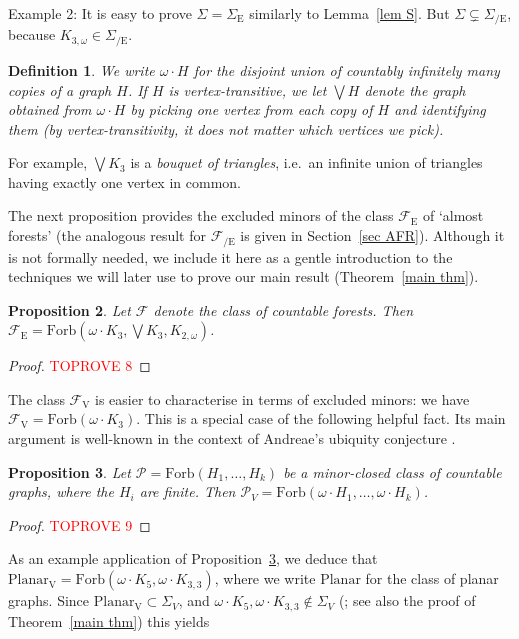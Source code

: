 \documentclass{article}
\newcommand{\forb}[1]{\mathrm{Forb}(#1)}
\newcommand{\plV}{\ensuremath{\mathrm{Planar_V}}}
\newcommand{\frs}{\mathcal{F}}
\newcommand{\frsV}{\frs_\mathrm{V}}
\newcommand{\frsE}{\frs_\mathrm{E}}
\newcommand{\frsCE}{\frs_\mathrm{{/E}}}
\newcommand{\Sig}{\ensuremath{\Sigma}}
\newcommand{\omdot}{\omega \cdot}
\newcommand{\defi}[1]{{\color{darkgray}\emph{#1}}}
\newtheorem{proposition}{Proposition}[section]
\newtheorem{definition}[proposition]{Definition}
\newcommand{\cp}{\ensuremath{\mathcal P}}
\newcommand{\Ktt}{\ensuremath{K_{3,3}}}
\newcommand{\Lr}[1]{Lemma~\ref{#1}}
\newcommand{\Tr}[1]{Theorem~\ref{#1}}
\newcommand{\Sr}[1]{Section~\ref{#1}}
\newcommand{\Prr}[1]{Pro\-position~\ref{#1}}
\begin{document}
Example 2: It is easy to prove $\Sig= \Sig_\mathrm{E}$ similarly to \Lr{lem S}. But $\Sig \subsetneq \Sig_\mathrm{/E}$, because $K_{3,\omega} \in \Sig_\mathrm{/E}$.


\begin{definition} \label{def omdot}
We write \defi{$\omdot H$} for the disjoint union of countably infinitely many copies of a graph $H$. If $H$ is  vertex-transitive, we let \defi{$\bigvee H$} denote the graph obtained from $\omdot H$ by picking one vertex from each copy of $H$ and identifying them (by vertex-transitivity, it does not matter which vertices we pick).
\end{definition} 
 For example, $\bigvee K_3$ is a \defi{bouquet of triangles}, i.e.\ an infinite union of triangles having exactly one vertex in common.

\medskip

The next proposition provides the excluded minors of the class $\frsE$ of `almost forests' (the analogous result for $\frsCE$ is given in \Sr{sec AFR}).
Although it is not formally needed, we include it here as a gentle introduction to the techniques we will later use to prove our main result (\Tr{main thm}).


\begin{proposition} \label{prop FE}
Let $\frs$ denote the class of countable forests. Then $\frsE= \forb{\omdot K_3, \bigvee K_3, K_{2,\omega}}$.
\end{proposition}
\begin{proof}\textcolor{red}{TOPROVE 8}\end{proof}

The class $\frsV$ is easier to characterise in terms of excluded minors: we have $\frsV= \forb{\omdot K_3}$. This is a special case of the following helpful fact. Its main argument is well-known in the context of Andreae's ubiquity conjecture \cite{AndUb}.

\begin{proposition} \label{prop PV}
Let $\cp= \forb{H_1, \ldots, H_k}$ be a minor-closed class of countable graphs, where the $H_i$ are finite. Then $\cp_V= \forb{\omdot H_1, \ldots, \omdot H_k}$.
\end{proposition}
\begin{proof}\textcolor{red}{TOPROVE 9}\end{proof}

As an example application of \Prr{prop PV}, we deduce that $\plV=\forb{\omdot K_5, \omdot \Ktt}$, where we write \defi{$\mathrm{Planar}$} for the class of planar graphs. Since $\plV \subset \Sig_V$, and  $\omdot K_5, \omdot \Ktt \not\in \Sig_V$ (\cite{BHKY}; see also the proof of \Tr{main thm}) this yields
\end{document}
